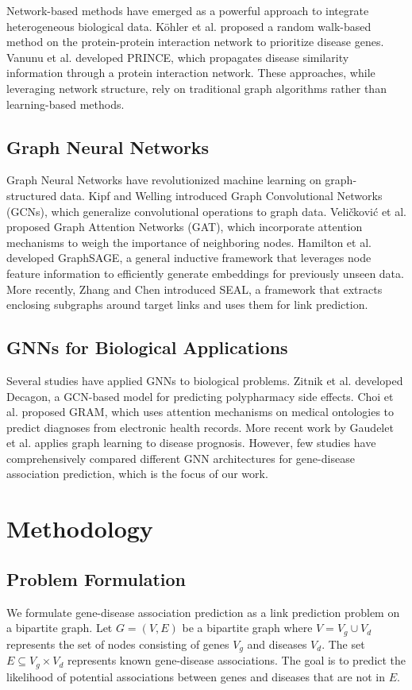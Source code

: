 \documentclass[conference]{IEEEtran}
\begin{document}
Network-based methods have emerged as a powerful approach to integrate heterogeneous biological data. Köhler et al. \cite{kohler2008interactome} proposed a random walk-based method on the protein-protein interaction network to prioritize disease genes. Vanunu et al. \cite{vanunu2010associating} developed PRINCE, which propagates disease similarity information through a protein interaction network. These approaches, while leveraging network structure, rely on traditional graph algorithms rather than learning-based methods.

\subsection{Graph Neural Networks}
Graph Neural Networks have revolutionized machine learning on graph-structured data. Kipf and Welling \cite{kipf2017semi} introduced Graph Convolutional Networks (GCNs), which generalize convolutional operations to graph data. Veličković et al. \cite{velickovic2018graph} proposed Graph Attention Networks (GAT), which incorporate attention mechanisms to weigh the importance of neighboring nodes. Hamilton et al. \cite{hamilton2017inductive} developed GraphSAGE, a general inductive framework that leverages node feature information to efficiently generate embeddings for previously unseen data. More recently, Zhang and Chen \cite{zhang2018link} introduced SEAL, a framework that extracts enclosing subgraphs around target links and uses them for link prediction.

\subsection{GNNs for Biological Applications}
Several studies have applied GNNs to biological problems. Zitnik et al. \cite{zitnik2018modeling} developed Decagon, a GCN-based model for predicting polypharmacy side effects. Choi et al. \cite{choi2017gram} proposed GRAM, which uses attention mechanisms on medical ontologies to predict diagnoses from electronic health records. More recent work by Gaudelet et al. \cite{gaudelet2022graph} applies graph learning to disease prognosis. However, few studies have comprehensively compared different GNN architectures for gene-disease association prediction, which is the focus of our work.

\section{Methodology}
\subsection{Problem Formulation}
We formulate gene-disease association prediction as a link prediction problem on a bipartite graph. Let $G = (V, E)$ be a bipartite graph where $V = V_g \cup V_d$ represents the set of nodes consisting of genes $V_g$ and diseases $V_d$. The set $E \subseteq V_g \times V_d$ represents known gene-disease associations. The goal is to predict the likelihood of potential associations between genes and diseases that are not in $E$.
\end{document}
